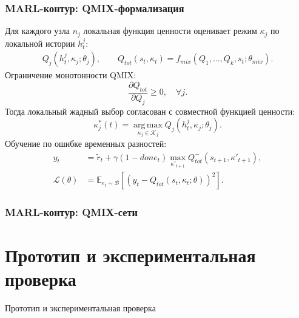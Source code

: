 \begin{frame}
	\frametitle{MARL-контур: QMIX-формализация}
	\small
	Для каждого узла $n_j$ локальная функция ценности оценивает режим $\kappa_j$ по локальной истории $h^j_t$:
	\begin{align*}
		Q_j(h^j_t,\kappa_j;\theta_j),\qquad
		Q_{tot}(s_t,\kappa_t)=f_{mix}(Q_1,\ldots,Q_k,s_t;\theta_{mix}).
	\end{align*}
	Ограничение монотонности QMIX:
	\[
	\frac{\partial Q_{tot}}{\partial Q_j}\geq 0,\quad \forall j.
	\]
	Тогда локальный жадный выбор согласован с совместной функцией ценности:
	\[
	\kappa_j^*(t)=\operatorname*{arg\,max}_{\kappa_j\in\mathcal{K}_j}Q_j(h^j_t,\kappa_j;\theta_j).
	\]
	Обучение по ошибке временных разностей:
	\begin{align*}
		y_t&=\tilde{r}_t+\gamma(1-done_t)
		\max_{\kappa'_{t+1}}Q^{-}_{tot}(s_{t+1},\kappa'_{t+1}),\\[-1mm]
		\mathcal{L}(\theta)&=
		\mathbb{E}_{e_t\sim\mathcal{B}}
		\left[\left(y_t-Q_{tot}(s_t,\kappa_t;\theta)\right)^2\right].
	\end{align*}
\end{frame}

\begin{frame}
	\frametitle{MARL-контур: QMIX-сети}
	\small
	\begin{center}
	\end{center}
\end{frame}

\section{Прототип и экспериментальная проверка}

\begin{frame}
    \begin{center}
        \Huge Прототип и экспериментальная проверка
    \end{center}
\end{frame}


